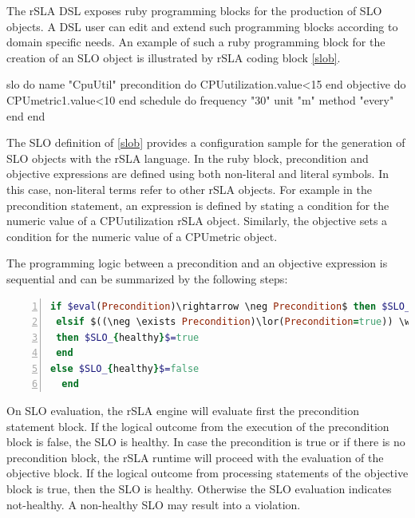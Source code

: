The rSLA DSL exposes ruby programming blocks for the production of SLO objects. A DSL user can edit and extend such programming blocks according to domain specific needs. An example of such a ruby programming block for the creation of an SLO object is illustrated by rSLA coding block \ref{slob}.
\begin{block}[caption=SLO definition, label=slob]
slo do
     name "CpuUtil"
     precondition do CPUutilization.value<15 end
     objective do CPUmetric1.value<10 end
     schedule do
      	frequency "30"
    	unit "m"
    	method "every"
    end
end	
\end{block}

The SLO definition of \ref{slob} provides a configuration sample for the generation of SLO objects with the rSLA language. In the ruby block, precondition and objective expressions are defined using both non-literal and literal symbols. In this case, non-literal terms refer to other rSLA objects. For example in the precondition statement, an expression is defined by stating a condition for the numeric value of a CPUutilization rSLA object. Similarly, the objective sets a condition for the numeric value of a CPUmetric object.

The programming logic between a precondition and an objective expression is sequential and can be summarized by the following steps:

\begin{lstlisting}[language=Ruby, basicstyle=\small\normalfont\sffamily, breaklines=true,  captionpos=b, mathescape=true, caption=rSLA SLO precondition-objective logic, label=ifelse, numbers=left, numbersep=5pt, numberstyle=\tiny]
if $eval(Precondition)\rightarrow \neg Precondition$ then $SLO_{healthy}$ = true
 elsif $((\neg \exists Precondition)\lor(Precondition=true)) \wedge eval(Objective) \rightarrow$ true
 then $SLO_{healthy}$=true 
 end
else $SLO_{healthy}$=false
  end
\end{lstlisting}

On SLO evaluation, the rSLA engine will evaluate first the precondition statement block. If the logical outcome from the execution of the precondition block is false, the SLO is healthy. In case the precondition is true or if there is no precondition block, the rSLA runtime will proceed with the evaluation of the objective block. If the logical outcome from processing statements of the objective block is true, then the SLO is healthy. Otherwise the SLO evaluation indicates not-healthy. A non-healthy SLO may result into a violation.